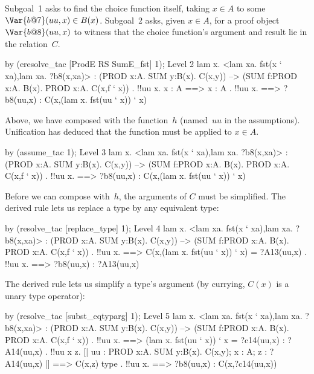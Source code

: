 Subgoal~1 asks to find the choice function itself, taking $x\in A$ to some
$\Var{b@7}(uu,x)\in B(x)$.  Subgoal~2 asks, given $x\in A$, for a proof
object $\Var{b@8}(uu,x)$ to witness that the choice function's argument
and result lie in the relation~$C$.  
\begin{ttbox}
by (eresolve_tac [ProdE RS SumE_fst] 1);
{\out Level 2}
{\out lam x. <lam xa. fst(x ` xa),lam xa. ?b8(x,xa)>}
{\out : (PROD x:A. SUM y:B(x). C(x,y)) -->}
{\out   (SUM f:PROD x:A. B(x). PROD x:A. C(x,f ` x))}
\ttbreak
{. !!uu x. x : A ==> x : A}
{. !!uu x.}
{ ==>}
{\out        ?b8(uu,x) : C(x,(lam x. fst(uu ` x)) ` x)}
\end{ttbox}
Above, we have composed  with the function~$h$ (named~$uu$ in
the assumptions).  Unification has deduced that the function must be
applied to $x\in A$.
\begin{ttbox}
by (assume_tac 1);
{\out Level 3}
{\out lam x. <lam xa. fst(x ` xa),lam xa. ?b8(x,xa)>}
{\out : (PROD x:A. SUM y:B(x). C(x,y)) -->}
{\out   (SUM f:PROD x:A. B(x). PROD x:A. C(x,f ` x))}
{. !!uu x.}
{ ==>}
{\out        ?b8(uu,x) : C(x,(lam x. fst(uu ` x)) ` x)}
\end{ttbox}
Before we can compose  with~$h$, the arguments of $C$ must be
simplified.  The derived rule  lets us replace a type
by any equivalent type:
\begin{ttbox}
by (resolve_tac [replace_type] 1);
{\out Level 4}
{\out lam x. <lam xa. fst(x ` xa),lam xa. ?b8(x,xa)>}
{\out : (PROD x:A. SUM y:B(x). C(x,y)) -->}
{\out   (SUM f:PROD x:A. B(x). PROD x:A. C(x,f ` x))}
\ttbreak
{. !!uu x.}
{ ==>}
{\out        C(x,(lam x. fst(uu ` x)) ` x) = ?A13(uu,x)}
\ttbreak
{. !!uu x.}
{ ==>}
{\out        ?b8(uu,x) : ?A13(uu,x)}
\end{ttbox}
The derived rule  lets us simplify a type's
argument (by currying, $C(x)$ is a unary type operator):
\begin{ttbox}
by (resolve_tac [subst_eqtyparg] 1);
{\out Level 5}
{\out lam x. <lam xa. fst(x ` xa),lam xa. ?b8(x,xa)>}
{\out : (PROD x:A. SUM y:B(x). C(x,y)) -->}
{\out   (SUM f:PROD x:A. B(x). PROD x:A. C(x,f ` x))}
\ttbreak
{. !!uu x.}
{ ==>}
{\out        (lam x. fst(uu ` x)) ` x = ?c14(uu,x) : ?A14(uu,x)}
\ttbreak
{. !!uu x z.}
{\out        [| uu : PROD x:A. SUM y:B(x). C(x,y); x : A;}
{\out           z : ?A14(uu,x) |] ==>}
{\out        C(x,z) type}
\ttbreak
{. !!uu x.}
{ ==>}
{\out        ?b8(uu,x) : C(x,?c14(uu,x))}
\end{ttbox}
